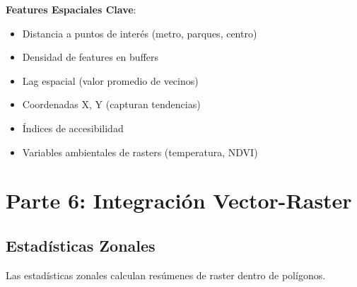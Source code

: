\documentclass[11pt,a4paper]{article}
\newcommand{\importante}[1]{\begin{tcolorbox}[colback=yellow!10,colframe=orange,title={Importante}]#1\end{tcolorbox}}
\begin{document}
\importante{
\textbf{Features Espaciales Clave}:
\begin{itemize}
    \item Distancia a puntos de interés (metro, parques, centro)
    \item Densidad de features en buffers
    \item Lag espacial (valor promedio de vecinos)
    \item Coordenadas X, Y (capturan tendencias)
    \item Índices de accesibilidad
    \item Variables ambientales de rasters (temperatura, NDVI)
\end{itemize}
}

\newpage

\section{Parte 6: Integración Vector-Raster}

\subsection{Estadísticas Zonales}

Las estadísticas zonales calculan resúmenes de raster dentro de polígonos.
\end{document}
